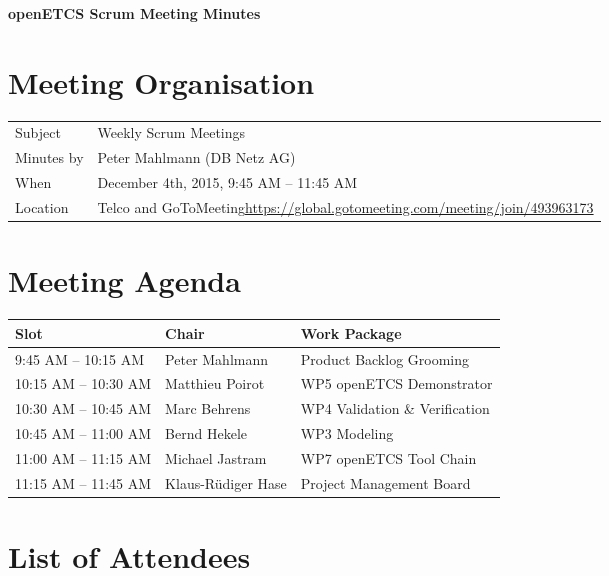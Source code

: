 \documentclass[a4paper, 11pt]{article}
\begin{document}
{\begin{center}\huge\bf openETCS Scrum Meeting Minutes\end{center}}

\section{Meeting Organisation}

\renewcommand{\arraystretch}{1.5}
\begin{supertabular}{m{.2\textwidth}m{.8\textwidth}}
Subject & Weekly Scrum Meetings\\
Minutes by & Peter Mahlmann (DB Netz AG)\\
When & December 4th, 2015, 9:45 AM -- 11:45 AM\\
Location & Telco and GoToMeeting\newline \url{https://global.gotomeeting.com/meeting/join/493963173}\\
\end{supertabular}

\renewcommand{\arraystretch}{1.0}
\section{Meeting Agenda}

\begin{tabular}{lll}
\toprule
\textbf{Slot} &  \textbf{Chair} & \textbf{Work Package} \\
\midrule 
9:45 AM -- 10:15 AM & Peter Mahlmann & Product Backlog Grooming  \\
10:15 AM -- 10:30 AM & Matthieu Poirot & WP5 openETCS Demonstrator \\  
10:30 AM -- 10:45 AM & Marc Behrens & WP4 Validation \& Verification \\
10:45 AM -- 11:00 AM & Bernd Hekele & WP3 Modeling \\
11:00 AM -- 11:15 AM & Michael Jastram & WP7 openETCS Tool Chain \\
11:15 AM -- 11:45 AM & Klaus-R\"udiger Hase & Project Management Board \\
\bottomrule
\end{tabular}

\section{List of Attendees}
\end{document}
